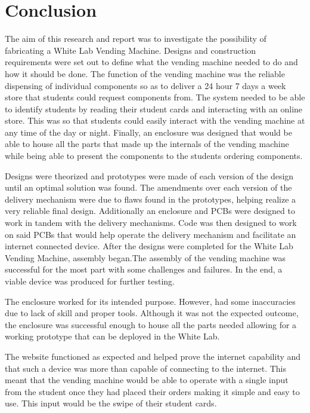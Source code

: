 \documentclass[a4paper,11pt]{article}
\numberwithin{figure}{section}
\numberwithin{table}{section}
\begin{document}
\section{Conclusion}\thispagestyle{sectionstart}
The aim of this research and report was to investigate the possibility of fabricating a White Lab Vending Machine. Designs and construction requirements were set out to define what the vending machine needed to do and how it should be done. The function of the vending machine was the reliable dispensing of individual components so as to deliver a 24 hour 7 days a week store that students could request components from. The system needed to be able to identify students by reading their student cards and interacting with an online store. This was so that students could easily interact with the vending machine at any time of the day or night. Finally, an enclosure was designed that would be able to house all the parts that made up the internals of the vending machine while being able to present the components to the students ordering components.

Designs were theorized and prototypes were made of each version of the design until an optimal solution was found. The amendments over each version of the delivery mechanism were due to flaws found in the prototypes, helping realize a very reliable final design. Additionally an enclosure and PCBs were designed to work in tandem with the delivery mechanisms. Code was then designed to work on said PCBs that would help operate the delivery mechanism and facilitate an internet connected device. After the designs were completed for the White Lab Vending Machine, assembly began.The assembly of the vending machine was successful for the most part with some challenges and failures. In the end, a viable device was produced for further testing. 

The enclosure worked for its intended purpose. However, had some inaccuracies due to lack of skill and proper tools. Although it was not the expected outcome, the enclosure was successful enough to house all the parts needed allowing for a working prototype that can be deployed in the White Lab.

The website functioned as expected and helped prove the internet capability and that such a device was more than capable of connecting to the internet. This meant that the vending machine would be able to operate with a single input from the student once they had placed their orders making it simple and easy to use. This input would be the swipe of their student cards. 
\end{document}
